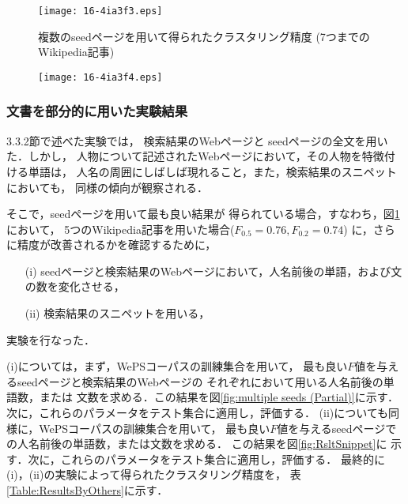 \documentclass[japanese]{jnlp_1.4}
\begin{document}
\begin{figure}[t]
\begin{center}
\texttt{[image: 16-4ia3f3.eps]}
\end{center}
\caption{複数のseedページを用いて得られたクラスタリング精度 (7つまでの Wikipedia記事)}
\label{fig:multiple seeds (Wiki)}
\end{figure}
\begin{figure}[t]
\begin{center}
\texttt{[image: 16-4ia3f4.eps]}
\end{center}
\label{fig:multiple seeds (Web)}
\end{figure}



    \subsubsection{文書を部分的に用いた実験結果}
\label{subsec:ExpResults(Fragments)}

3.3.2節で述べた実験では，
検索結果のWebページと seedページの全文を用いた．しかし，
人物について記述されたWebページにおいて，その人物を特徴付ける単語は，
人名の周囲にしばしば現れること，また，検索結果のスニペットにおいても，
同様の傾向が観察される．

そこで，seedページを用いて最も良い結果が
得られている場合，すなわち，図\ref{fig:multiple seeds (Wiki)}において，
5つのWikipedia記事を用いた場合($F_{0.5}=0.76, F_{0.2}=0.74$)
に，さらに精度が改善されるかを確認するために，
\begin{itemize}
 \item[(i)] seedページと検索結果のWebページにおいて，人名前後の単語，および文の数を変化させる， 
 \item[(ii)] 検索結果のスニペットを用いる， 
\end{itemize}
実験を行なった．

(i)については，まず，WePSコーパスの訓練集合を用いて，
最も良い$F$値を与えるseedページと検索結果のWebページの
それぞれにおいて用いる人名前後の単語数，または
文数を求める．この結果を図\ref{fig:multiple seeds (Partial)}に示す．
次に，これらのパラメータをテスト集合に適用し，評価する．
(ii)についても同様に，WePSコーパスの訓練集合を用いて，
最も良い$F$値を与えるseedページでの人名前後の単語数，または文数を求める．
この結果を図\ref{fig:RsltSnippet}に
示す．次に，これらのパラメータをテスト集合に適用し，評価する．
最終的に(i)，(ii)の実験によって得られたクラスタリング精度を，
表\ref{Table:ResultsByOthers}に示す．
\end{document}
